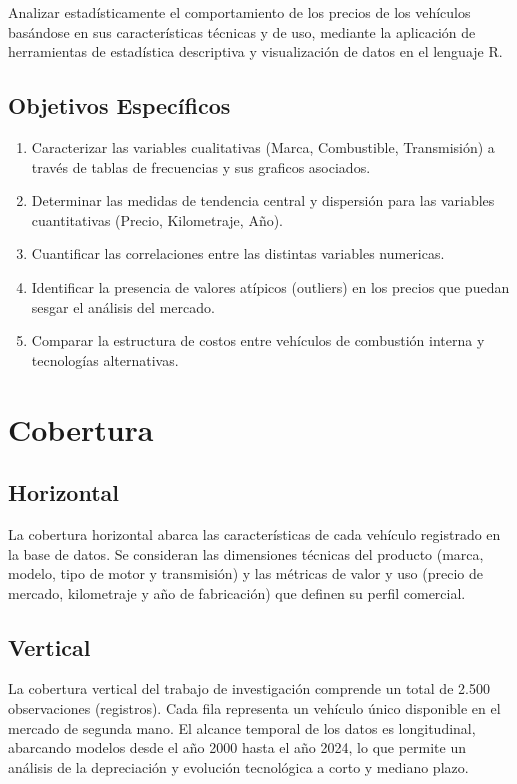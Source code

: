 \documentclass[oneside,11pt]{Latex/Classes/PhDthesisPSnPDF}
\begin{document}
Analizar estadísticamente el comportamiento de los precios de los
vehículos basándose en sus características técnicas y de uso, mediante
la aplicación de herramientas de estadística descriptiva y visualización
de datos en el lenguaje R.

\subsection{Objetivos Específicos}

\begin{enumerate}
  \item Caracterizar las variables cualitativas (Marca, Combustible, Transmisión) a través de tablas de frecuencias y sus graficos asociados.
  \item Determinar las medidas de tendencia central y dispersión para las variables cuantitativas (Precio, Kilometraje, Año).
  \item Cuantificar las correlaciones entre las distintas variables numericas.
  \item Identificar la presencia de valores atípicos (outliers) en los precios que puedan sesgar el análisis del mercado.
  \item Comparar la estructura de costos entre vehículos de combustión interna y tecnologías alternativas.
\end{enumerate}

\section{Cobertura}

\subsection{Horizontal}

La cobertura horizontal abarca las características de cada vehículo
registrado en la base de datos. Se consideran las dimensiones técnicas
del producto (marca, modelo, tipo de motor y transmisión) y las métricas
de valor y uso (precio de mercado, kilometraje y año de fabricación) que
definen su perfil comercial.

\subsection{Vertical}

La cobertura vertical del trabajo de investigación comprende un total de
2.500 observaciones (registros). Cada fila representa un vehículo único
disponible en el mercado de segunda mano. El alcance temporal de los
datos es longitudinal, abarcando modelos desde el año 2000 hasta el año
2024, lo que permite un análisis de la depreciación y evolución
tecnológica a corto y mediano plazo.
\end{document}
